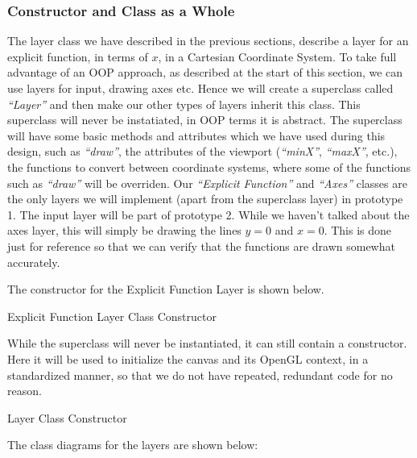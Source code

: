 \documentclass[../../../../../../../main.tex]{subfiles}
\begin{document}
\subsubsection{Constructor and Class as a Whole}
The layer class we have described in the previous sections, describe a layer for an explicit function, in terms of $x$, in a Cartesian Coordinate System. To take full advantage of an OOP approach, as described at the start of this section, we can use layers for input, drawing axes etc. Hence we will create a superclass called \textit{``Layer''} and then make our other types of layers inherit this class. This superclass will never be instatiated, in OOP terms it is abstract. The superclass will have some basic methods and attributes which we have used during this design, such as \textit{``draw''}, the attributes of the viewport (\textit{``minX''}, \textit{``maxX''}, etc.), the functions to convert between coordinate systems, where some of the functions such as \textit{``draw''} will be overriden. Our \textit{``Explicit Function''} and \textit{``Axes''} classes are the only layers we will implement (apart from the superclass layer) in prototype 1. The input layer will be part of prototype 2. While we haven't talked about the axes layer, this will simply be drawing the lines $y=0$ and $x=0$. This is done just for reference so that we can verify that the functions are drawn somewhat accurately.

The constructor for the Explicit Function Layer is shown below.

\begin{algorithm}[H]
\DontPrintSemicolon
\caption{Explicit Function Layer Class Constructor}
\end{algorithm}

While the superclass will never be instantiated, it can still contain a constructor. Here it will be used to initialize the canvas and its OpenGL context, in a standardized manner, so that we do not have repeated, redundant code for no reason.

\begin{algorithm}[H]
\DontPrintSemicolon
\caption{Layer Class Constructor}
\end{algorithm}

The class diagrams for the layers are shown below:
\end{document}
